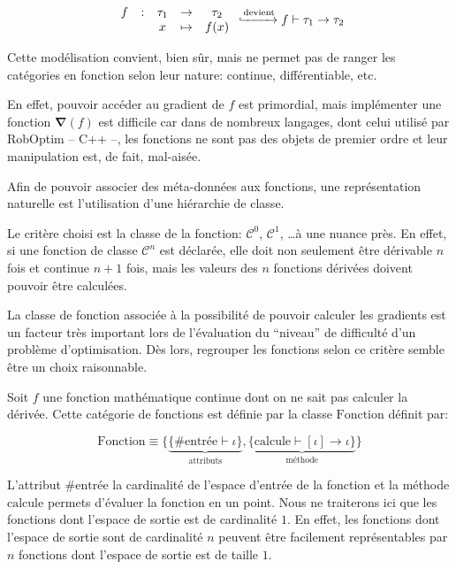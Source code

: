 \begin{equation}
  \begin{array}{ccccc}
    f & : & \tau_1 & \rightarrow & \tau_2\\
    ~ & ~ & x      & \mapsto     & f(x)
  \end{array}
  \xhookrightarrow{\text{devient}}
  f \vdash \tau_1 \rightarrow \tau_2
\end{equation}

Cette modélisation convient, bien sûr, mais ne permet pas de ranger
les catégories en fonction selon leur nature: continue,
différentiable, etc.

En effet, pouvoir accéder au gradient de $f$ est primordial, mais
implémenter une fonction $\mathbf{\nabla}(f)$ est difficile car dans
de nombreux langages, dont celui utilisé par RobOptim -- C++ --, les
fonctions ne sont pas des objets de premier ordre et leur manipulation
est, de fait, mal-aisée.

Afin de pouvoir associer des méta-données aux fonctions, une
représentation naturelle est l'utilisation d'une hiérarchie de classe.

Le critère choisi est la classe de la fonction: $\mathcal{C}^0$,
$\mathcal{C}^1$, \ldots à une nuance près. En effet, si une fonction
de classe $\mathcal{C}^n$ est déclarée, elle doit non seulement être
dérivable $n$ fois et continue $n+1$ fois, mais les valeurs des $n$
fonctions dérivées doivent pouvoir être calculées.

La classe de fonction associée à la possibilité de pouvoir calculer
les gradients est un facteur très important lors de l'évaluation du
``niveau'' de difficulté d'un problème d'optimisation. Dès lors,
regrouper les fonctions selon ce critère semble être un choix
raisonnable.

\begin{mydef}\label{def:chap1_fcn}
  Soit $f$ une fonction mathématique continue dont on ne sait pas
  calculer la dérivée. Cette catégorie de fonctions est définie par la
  classe $\text{Fonction}$ définit par:

  \begin{equation}
    \text{Fonction} \equiv \{ \underbrace{\{ \#\text{entrée} \vdash
      \iota \}}_{\text{attributs}}, \underbrace{\{ \text{calcule}
      \vdash [\iota] \rightarrow \iota \}}_{\text{méthode}} \}
  \end{equation}

  L'attribut $\#\text{entrée}$ la cardinalité de l'espace d'entrée de
  la fonction et la méthode $\text{calcule}$ permets d'évaluer la
  fonction en un point. Nous ne traiterons ici que les fonctions dont
  l'espace de sortie est de cardinalité $1$. En effet, les fonctions
  dont l'espace de sortie sont de cardinalité $n$ peuvent être
  facilement représentables par $n$ fonctions dont l'espace de sortie
  est de taille $1$.
\end{mydef}

